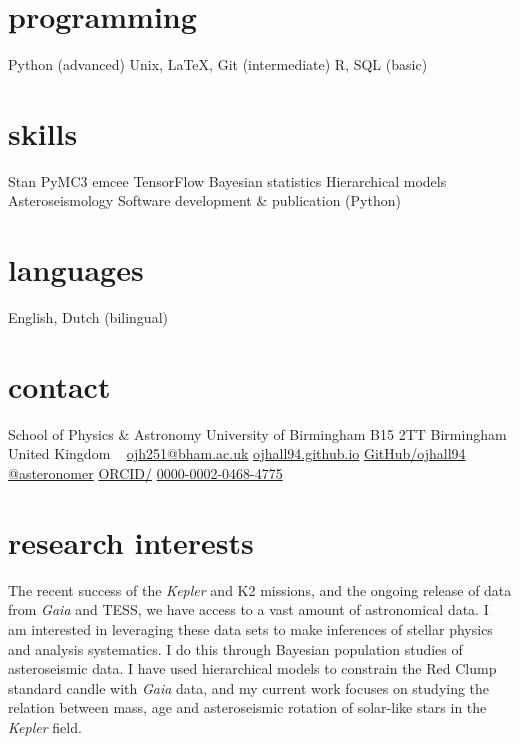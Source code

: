 \documentclass[]{k-cv} %
\begin{document}


\begin{aside} %
\section{programming}
Python (advanced)
Unix, LaTeX, Git (intermediate)
R, SQL (basic)
\section{skills}
Stan
PyMC3
emcee 
TensorFlow
Bayesian statistics
Hierarchical models
Asteroseismology
Software development \& publication (Python)
\section{languages}
English, Dutch (bilingual)
\section{contact}
School of Physics \& Astronomy
University of Birmingham
B15 2TT
Birmingham
United Kingdom
~
\href{mailto:ojh251@student.bham.ac.uk}{ojh251@bham.ac.uk}
\href{http://www.ojhall94.github.io}{ojhall94.github.io}
\href{http://www.github.com/ojhall94}{GitHub/ojhall94}
\href{http://www.twitter.com/asteronomer}{@asteronomer}
\href{http://www.orcid.com/0000-0002-0468-4775}{ORCID/}
\href{http://www.orcid.com/0000-0002-0468-4775}{0000-0002-0468-4775}
\end{aside}

\section{research interests}
\bodyfont The recent success of the \textit{Kepler} and K2 missions, and the ongoing release of data from \textit{Gaia} and TESS, we have access to a vast amount of astronomical data. I am interested in leveraging these data sets to make inferences of stellar physics and analysis systematics. I do this through Bayesian population studies of asteroseismic data. I have used hierarchical models to constrain the Red Clump standard candle with \emph{Gaia} data, and my current work focuses on studying the relation between mass, age and asteroseismic rotation of solar-like stars in the \textit{Kepler} field.
\end{document}
